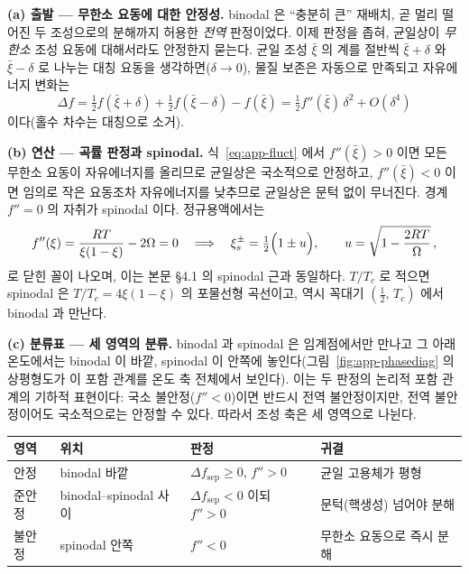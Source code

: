\documentclass[11pt,a4paper]{article}
\begin{document}
\textbf{(a) 출발 --- 무한소 요동에 대한 안정성.} binodal 은 ``충분히 큰'' 재배치, 곧 멀리 떨어진 두
조성으로의 분해까지 허용한 \emph{전역} 판정이었다. 이제 판정을 좁혀, 균일상이 \emph{무한소} 조성
요동에 대해서라도 안정한지 묻는다. 균일 조성 $\bar\xi$ 의 계를 절반씩 $\bar\xi+\delta$ 와
$\bar\xi-\delta$ 로 나누는 대칭 요동을 생각하면($\delta\to0$), 물질 보존은 자동으로 만족되고
자유에너지 변화는
\begin{equation}
\Delta f=\tfrac12 f(\bar\xi+\delta)+\tfrac12 f(\bar\xi-\delta)-f(\bar\xi)
=\tfrac12 f''(\bar\xi)\,\delta^2+O(\delta^4)
\label{eq:app-fluct}
\end{equation}
이다(홀수 차수는 대칭으로 소거).

\textbf{(b) 연산 --- 곡률 판정과 spinodal.} 식~\eqref{eq:app-fluct} 에서 $f''(\bar\xi)>0$ 이면 모든
무한소 요동이 자유에너지를 올리므로 균일상은 국소적으로 안정하고, $f''(\bar\xi)<0$ 이면 임의로 작은
요동조차 자유에너지를 낮추므로 균일상은 문턱 없이 무너진다. 경계 $f''=0$ 의 자취가 spinodal 이다.
정규용액에서는
\begin{equation}
f''(\xi)=\frac{RT}{\xi(1-\xi)}-2\Omega=0
\quad\Longrightarrow\quad
\xi_s^\pm=\tfrac12\Bigl(1\pm u\Bigr),\qquad u=\sqrt{1-\frac{2RT}{\Omega}}\,,
\label{eq:app-spinodal}
\end{equation}
로 닫힌 꼴이 나오며, 이는 본문 \S4.1 의 spinodal 근과 동일하다. $T/T_c$ 로 적으면 spinodal 은
$T/T_c=4\xi(1-\xi)$ 의 포물선형 곡선이고, 역시 꼭대기 $(\tfrac12,\,T_c)$ 에서 binodal 과 만난다.

\textbf{(c) 분류표 --- 세 영역의 분류.} binodal 과 spinodal 은 임계점에서만 만나고 그 아래 온도에서는
binodal 이 바깥, spinodal 이 안쪽에 놓인다(그림~\ref{fig:app-phasediag} 의 상평형도가 이 포함 관계를
온도 축 전체에서 보인다). 이는 두 판정의 논리적 포함 관계의 기하적 표현이다:
국소 불안정($f''<0$)이면 반드시 전역 불안정이지만, 전역 불안정이어도 국소적으로는 안정할 수 있다.
따라서 조성 축은 세 영역으로 나뉜다.
\begin{center}
\begin{tabular}{@{}llll@{}}
\toprule
영역 & 위치 & 판정 & 귀결 \\
\midrule
안정 & binodal 바깥 & $\Delta f_\mathrm{sep}\ge0$, $f''>0$ & 균일 고용체가 평형 \\
준안정 & binodal--spinodal 사이 & $\Delta f_\mathrm{sep}<0$ 이되 $f''>0$ & 문턱(핵생성) 넘어야 분해 \\
불안정 & spinodal 안쪽 & $f''<0$ & 무한소 요동으로 즉시 분해 \\
\bottomrule
\end{tabular}
\end{center}
\end{document}
